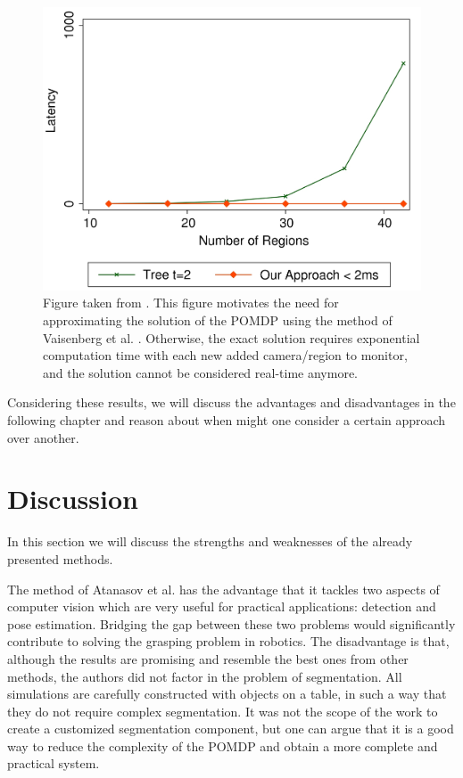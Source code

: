 \documentclass[a4paper,11pt,english]{article}
\begin{document}
\begin{figure}[t!]
  
  \centering
    \includegraphics[scale=0.15]{vaisenbergevaluation2_highres.jpg}
    \caption{Figure taken from \cite{vaisenberg2014scheduling}.
  This figure motivates the need for approximating the solution of the POMDP using the method of Vaisenberg et al. \cite{vaisenberg2014scheduling}. Otherwise, the exact solution requires exponential computation time with each new added camera/region to monitor, and the solution cannot be considered real-time anymore.}
  \label{vaisenbergevaluation2}
\end{figure}













Considering these results, we will discuss the advantages and disadvantages in the following chapter and reason about when might one consider a certain approach over another.

\section{Discussion} %

In this section we will discuss the strengths and weaknesses of the already presented methods.

The method of Atanasov et al. \cite{atanasov2014nonmyopic} has the advantage that it tackles two aspects of computer vision which are very useful for practical applications: detection and pose estimation. Bridging the gap between these two problems would significantly contribute to solving the grasping problem in robotics. The disadvantage is that, although the results are promising and resemble the best ones from other methods, the authors did not factor in the problem of segmentation. All simulations are carefully constructed with objects on a table, in such a way that they do not require complex segmentation. It was not the scope of the work to create a customized segmentation component, but one can argue that it is a good way to reduce the complexity of the POMDP and obtain a more complete and practical system.
\end{document}
